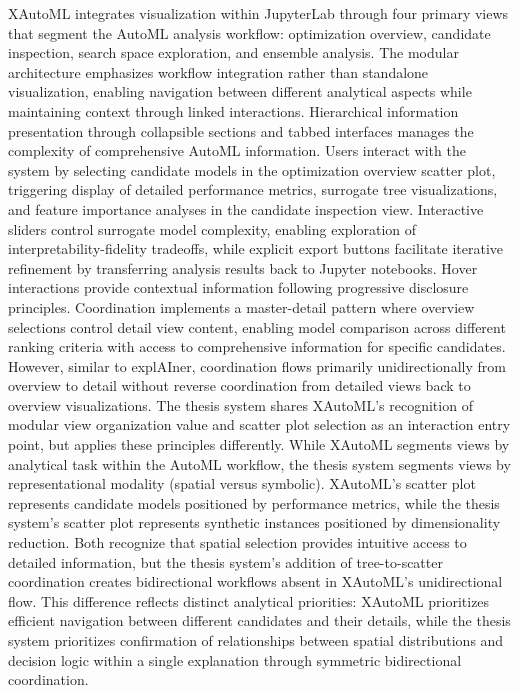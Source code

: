 XAutoML \cite{Z_ller_2023} integrates visualization within JupyterLab through four primary views that segment the AutoML analysis workflow: optimization overview, candidate inspection, search space exploration, and ensemble analysis. The modular architecture emphasizes workflow integration rather than standalone visualization, enabling navigation between different analytical aspects while maintaining context through linked interactions. Hierarchical information presentation through collapsible sections and tabbed interfaces manages the complexity of comprehensive AutoML information. Users interact with the system by selecting candidate models in the optimization overview scatter plot, triggering display of detailed performance metrics, surrogate tree visualizations, and feature importance analyses in the candidate inspection view. Interactive sliders control surrogate model complexity, enabling exploration of interpretability-fidelity tradeoffs, while explicit export buttons facilitate iterative refinement by transferring analysis results back to Jupyter notebooks. Hover interactions provide contextual information following progressive disclosure principles. Coordination implements a master-detail pattern where overview selections control detail view content, enabling model comparison across different ranking criteria with access to comprehensive information for specific candidates. However, similar to explAIner, coordination flows primarily unidirectionally from overview to detail without reverse coordination from detailed views back to overview visualizations. The thesis system shares XAutoML's recognition of modular view organization value and scatter plot selection as an interaction entry point, but applies these principles differently. While XAutoML segments views by analytical task within the AutoML workflow, the thesis system segments views by representational modality (spatial versus symbolic). XAutoML's scatter plot represents candidate models positioned by performance metrics, while the thesis system's scatter plot represents synthetic instances positioned by dimensionality reduction. Both recognize that spatial selection provides intuitive access to detailed information, but the thesis system's addition of tree-to-scatter coordination creates bidirectional workflows absent in XAutoML's unidirectional flow. This difference reflects distinct analytical priorities: XAutoML prioritizes efficient navigation between different candidates and their details, while the thesis system prioritizes confirmation of relationships between spatial distributions and decision logic within a single explanation through symmetric bidirectional coordination.


